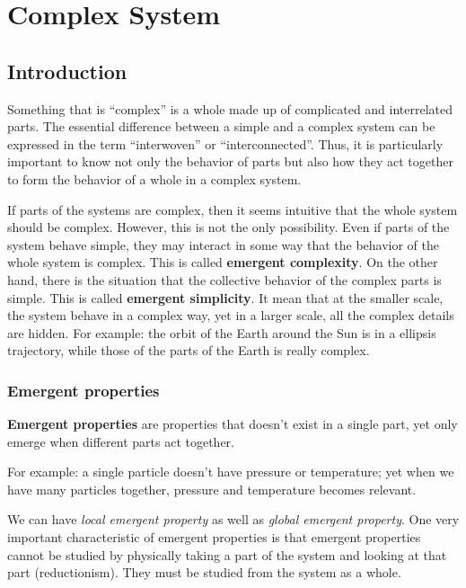 
\chapter{Complex System}
\label{chap:complex-system}

\section{Introduction}
\label{sec:introduction-5}

Something that is ``complex'' is a whole made up of complicated and
interrelated parts. The essential difference between a simple and a
complex system can be expressed in the term ``interwoven'' or
``interconnected''. Thus, it is particularly important to know not
only the behavior of parts but also how they act together to form the
behavior of a whole in a complex system.

If parts of the systems are complex, then it seems intuitive that the
whole system should be complex. However, this is not the only
possibility. Even if parts of the system behave simple, they may
interact in some way that the behavior of the whole system is
complex. This is called {\bf emergent complexity}.  On the other hand,
there is the situation that the collective behavior of the complex
parts is simple. This is called {\bf emergent simplicity}. It mean
that at the smaller scale, the system behave in a complex way, yet in
a larger scale, all the complex details are hidden. For example: the
orbit of the Earth around the Sun is in a ellipsis trajectory, while
those of the parts of the Earth is really complex.

\subsection{Emergent properties}
\label{sec:emergent-properties}

{\bf Emergent properties} are properties that doesn't exist in a
single part, yet only emerge when different parts act together. 

For example: a single particle doesn't have pressure or temperature;
yet when we have many particles together, pressure and temperature
becomes relevant. 

We can have {\it local emergent property} as well as
{\it global emergent property}.  One very important characteristic of
emergent properties is that emergent properties cannot be studied by
physically taking a part of the system and looking at that part
(reductionism). They must be studied from the system as a whole.

